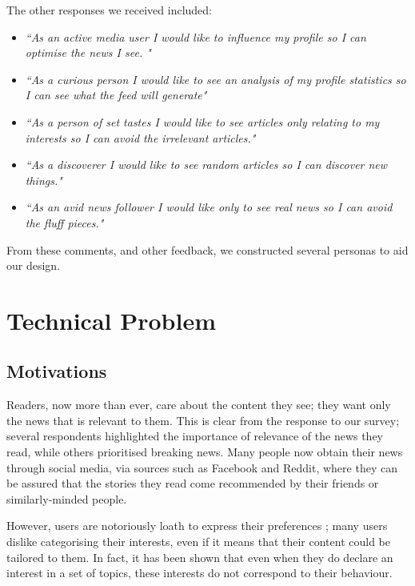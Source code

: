 \documentclass[11pt]{article}
\begin{document}
The other responses we received included:

\begin{itemize}
\item\textit{``As an active media user I would like to influence my profile so I can optimise the news I see. " }
\item\textit{``As a curious person I would like to see an analysis of my profile statistics so I can see what the feed will generate" }
\item\textit{``As a person of set tastes I would like to see articles only relating to my interests so I can avoid the irrelevant articles." }
\item\textit{``As a discoverer I would like to see random articles so I can discover new things." }
\item\textit{``As an avid news follower I would like only to see real news so I can avoid the fluff pieces." } 
\end{itemize}

From these comments, and other feedback, we constructed several personas to aid our design. 


\section{Technical Problem}

\subsection{Motivations}
Readers, now more than ever, care about the content they see; they want only the news that is relevant to them. This is clear from the response to our survey; several respondents highlighted the importance of relevance of the news they read, while others prioritised breaking news. Many people now obtain their news through social media, via sources such as Facebook and Reddit, where they can be assured that the stories they read come recommended by their friends or similarly-minded people. 

However, users are notoriously loath to express their preferences \cite{recommender_analysis}; many users dislike categorising their interests, even if it means that their content could be tailored to them. In fact, it has been shown that even when they do declare an interest in a set of topics, these interests do not correspond to their behaviour\cite{user_attitudes}.
\end{document}
